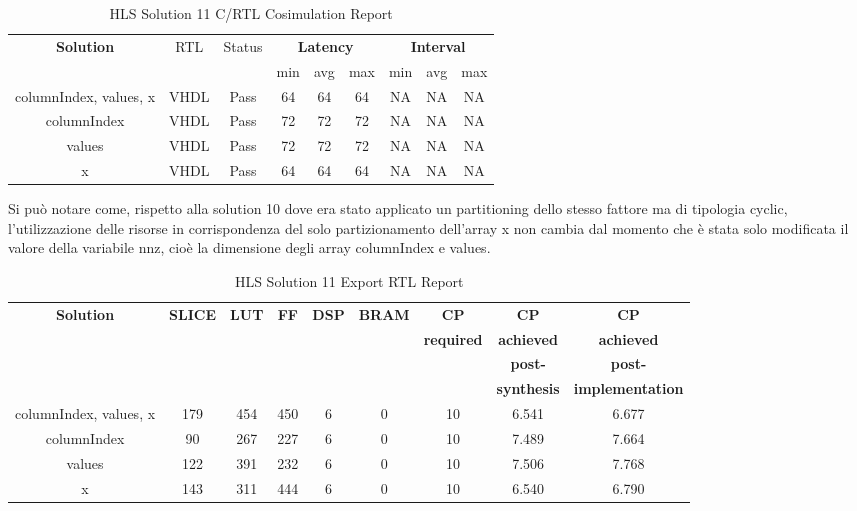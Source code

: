 \begin{table}[H]
	\centering
	\begin{tabular}{|c|c|c|c|c|c|c|c|c|}
		\hline
		\multicolumn{1}{|c|}{\textbf{Solution}} & \multicolumn{1}{|c|}{RTL} & \multicolumn{1}{|c|}{Status} & \multicolumn{3}{c|}{\textbf{Latency}} & \multicolumn{3}{c|}{\textbf{Interval}} \\
		& &  & min & avg & max & min & avg & max \\
		\hline
		columnIndex, values, x & VHDL & Pass & 64 & 64 & 64 & NA & NA & NA \\
		\hline
		columnIndex & VHDL & Pass & 72 & 72 & 72 & NA & NA & NA \\
		\hline
		values & VHDL & Pass & 72 & 72 & 72 & NA & NA & NA \\
		\hline
		x & VHDL & Pass & 64 & 64 & 64 & NA & NA & NA \\
		\hline
	\end{tabular}
	\caption{HLS Solution 11 C/RTL Cosimulation Report }
	\label{tab:hls-solution-11-cosimulation-report}
\end{table}

Si può notare come, rispetto alla solution 10 dove era stato applicato un partitioning dello stesso fattore ma di tipologia cyclic, l'utilizzazione delle risorse in corrispondenza del solo partizionamento dell'array x non cambia dal momento che è stata solo modificata il valore della variabile nnz, cioè la dimensione degli array columnIndex e values.

\begin{table}[H]
	\centering
	\begin{tabular}{|c|c|c|c|c|c|c|c|c|}
		\hline
		\textbf{Solution} & \textbf{SLICE} & \textbf{LUT} & \textbf{FF} & \textbf{DSP} & \textbf{BRAM} & \textbf{CP} & \textbf{CP} & \textbf{CP} \\
		& & & & & & \textbf{required} & \textbf{achieved} & \textbf{achieved}\\
		& & & & & & & \textbf{post-} & \textbf{post-}\\
		& & & & & & & \textbf{synthesis} & \textbf{implementation}\\
		\hline
		columnIndex, values, x  & 179 & 454 & 450 & 6 & 0 & 10 & 6.541 & 6.677 \\
		\hline
		columnIndex  & 90 & 267 & 227 & 6 & 0 & 10 & 7.489 & 7.664 \\
		\hline
		values  & 122 & 391 & 232 & 6 & 0 & 10 & 7.506 & 7.768 \\
		\hline
		x  & 143 & 311 & 444 & 6 & 0 & 10 & 6.540 & 6.790 \\
		\hline
	\end{tabular}
	\caption{HLS Solution 11 Export RTL Report}
	\label{tab:hls-solution-11-export-rtl-report}
\end{table}